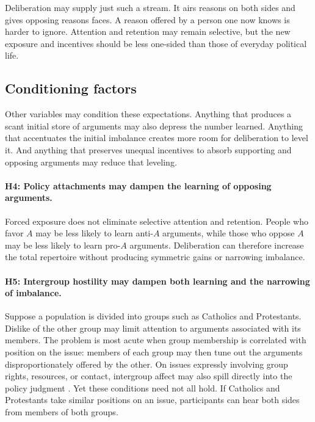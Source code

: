 \documentclass[11pt]{article}
\begin{document}
Deliberation may supply just such a stream. It airs reasons on both sides and gives opposing
reasons faces. A reason offered by a person one now knows is harder to ignore. Attention and
retention may remain selective, but the new exposure and incentives should be less one-sided
than those of everyday political life.

\subsection{Conditioning factors}

Other variables may condition these expectations. Anything that produces a scant initial store
of arguments may also depress the number learned. Anything that accentuates the initial
imbalance creates more room for deliberation to level it. And anything that preserves unequal
incentives to absorb supporting and opposing arguments may reduce that leveling.

\paragraph{H4: Policy attachments may dampen the learning of opposing arguments.}
Forced exposure does not eliminate selective attention and retention. People who favor $A$
may be less likely to learn anti-$A$ arguments, while those who oppose $A$ may be less likely to
learn pro-$A$ arguments. Deliberation can therefore increase the total repertoire without
producing symmetric gains or narrowing imbalance.

\paragraph{H5: Intergroup hostility may dampen both learning and the narrowing of imbalance.}
Suppose a population is divided into groups such as Catholics and Protestants. Dislike of the
other group may limit attention to arguments associated with its members. The problem is most
acute when group membership is correlated with position on the issue: members of each group
may then tune out the arguments disproportionately offered by the other. On issues expressly
involving group rights, resources, or contact, intergroup affect may also spill directly into
the policy judgment \citep{altemeyer1996authoritarian,marcus1995malice,kim2011contact}.
Yet these conditions need not all hold. If Catholics and Protestants take
similar positions on an issue, participants can hear both sides from members of both groups.
\end{document}
